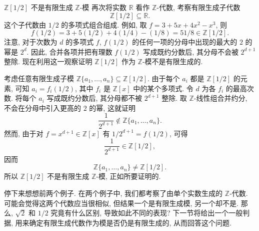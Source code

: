 \begin{Example}{{\textmd{$\mathbb{Z}[1/2]$} 不是有限生成 $\mathbb{Z}$-模}}\leavevmode\label{ex:half-not-finite-module}
  再次将实数 $\mathbb{R}$ 看作 $\mathbb{Z}$-代数, 考察有限生成子代数
  \[
    \mathbb{Z}[1/2]\subseteq\mathbb{R}.
  \]
  这个子代数由 $1/2$ 的多项式组合组成. 例如, 取 $f=3+5x+4x^{2}-x^{3}$, 则
  \[
    f(1/2)=3+5(1/2)+4(1/4)-(1/8)=51/8\in\mathbb{Z}[1/2].
  \]
  注意, 对于次数为 $d$ 的多项式 $f$, $f(1/2)$ 的任何一项的分母中出现的最大的 $2$ 的幂是 $2^{d}$. 因此, 合并各项并把有理数 $f(1/2)$ 写成既约分数后, 其分母不会被 $2^{d+1}$ 整除. 现在利用这一观察证明 $\mathbb{Z}[1/2]$ 作为 $\mathbb{Z}$-模不是有限生成的.

  考虑任意有限生成子模 $\mathbb{Z}\{a_{1},\ldots,a_{n}\}\subseteq\mathbb{Z}[1/2]$. 由于每个 $a_{i}$ 都是 $\mathbb{Z}[1/2]$ 的元素, 可知 $a_{i}=f_{i}(1/2)$, 其中 $f_{i}$ 是 $\mathbb{Z}[x]$ 中的某个多项式. 令 $d$ 为各 $f_{i}$ 的最高次数. 将每个 $a_{i}$ 写成既约分数后, 其分母都不被 $2^{d+1}$ 整除. 取 $\mathbb{Z}$-线性组合并约分, 不会在分母中引入更高的 $2$ 的幂, 这就证明
  \[
    \frac{1}{2^{d+1}}\notin\mathbb{Z}\{a_{1},\ldots,a_{n}\}.
  \]
  然而, 由于对 $f=x^{d+1}\in\mathbb{Z}[x]$ 有 $1/2^{d+1}=f(1/2)$, 可得
  \[
    \frac{1}{2^{d+1}}\in\mathbb{Z}[1/2],
  \]
  因而
  \[
    \mathbb{Z}\{a_{1},\ldots,a_{n}\}\ne\mathbb{Z}[1/2].
  \]
  所以 $\mathbb{Z}[1/2]$ 不是有限生成 $\mathbb{Z}$-模, 正如所要证明的.
\end{Example}

停下来想想前两个例子. 在两个例子中, 我们都考察了由单个实数生成的 $\mathbb{Z}$-代数. 可能会觉得这两个代数应当很相似, 但结果一个是有限生成模, 另一个却不是. 那么, $\sqrt{2}$ 和 $1/2$ 究竟有什么区别, 导致如此不同的表现? 下一节将给出一个一般判据, 用来确定有限生成代数作为模是否仍是有限生成的, 从而回答这个问题.

